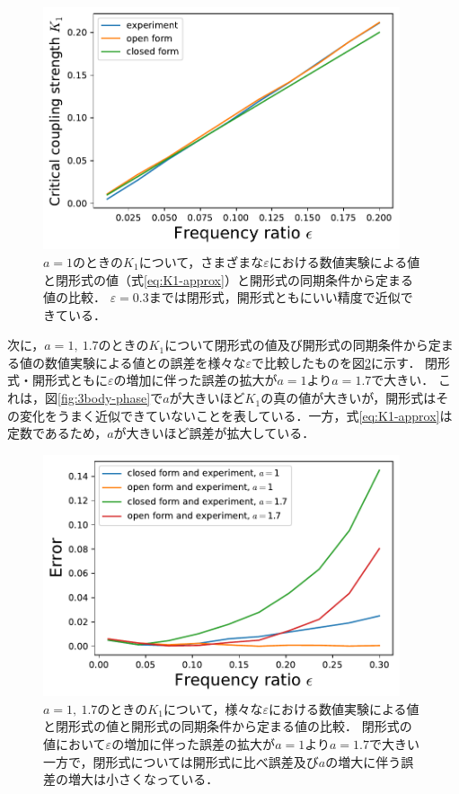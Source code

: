 \documentclass[../main]{subfiles}
\begin{document}
\begin{figure}[tbp]
\centering
\includegraphics[width=105mm]{./images/k1-compare.pdf}
\centering
\caption{$a=1$のときの$K_1$について，さまざまな$\varepsilon$における数値実験による値と閉形式の値（式\eqref{eq:K1-approx}）と開形式の同期条件から定まる値の比較．
$\varepsilon=0.3$までは閉形式，開形式ともにいい精度で近似できている．}
\label{fig:k1-compare}
\end{figure}

次に，$a=1,\ 1.7$のときの$K_1$について閉形式の値及び開形式の同期条件から定まる値の数値実験による値との誤差を様々な$\varepsilon$で比較したものを図\ref{fig:k1-error}に示す．
閉形式・開形式ともに$\varepsilon$の増加に伴った誤差の拡大が$a=1$より$a=1.7$で大きい．
これは，図\ref{fig:3body-phase}で$a$が大きいほど$K_1$の真の値が大きいが，開形式はその変化をうまく近似できていないことを表している．一方，式\eqref{eq:K1-approx}は定数であるため，$a$が大きいほど誤差が拡大している．

\begin{figure}[tbp]
\centering
\includegraphics[width=105mm]{./images/k1-error.pdf}
\centering
\caption{$a=1,\ 1.7$のときの$K_1$について，様々な$\varepsilon$における数値実験による値と閉形式の値と開形式の同期条件から定まる値の比較．
閉形式の値において$\varepsilon$の増加に伴った誤差の拡大が$a=1$より$a=1.7$で大きい一方で，閉形式については開形式に比べ誤差及び$a$の増大に伴う誤差の増大は小さくなっている．}
\label{fig:k1-error}
\end{figure}
\end{document}
